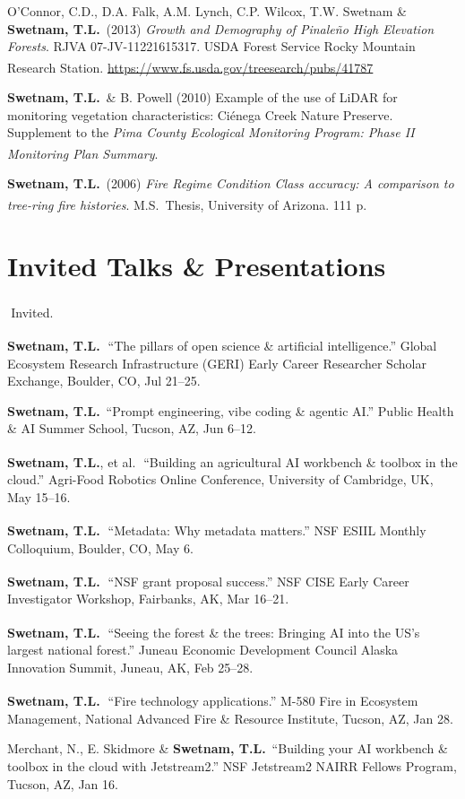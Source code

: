\documentclass[11pt,letterpaper]{article}
\newcommand{\me}{\textbf{Swetnam, T.L.}}
\newcommand{\inv}{\textsuperscript{\color{cherry}\,\ding{72}}}
\newcommand{\grad}{\textsuperscript{\color{muted}\,\dag}}
\newcommand{\yearhead}[1]{\par\vspace{5pt}{\small\bfseries\color{cherry}#1}\par\vspace{2pt}}
\newcommand{\note}[1]{{\small\color{muted}#1}}
\newenvironment{hanglist}
  {\begin{list}{}{\setlength{\leftmargin}{1.4em}\setlength{\itemindent}{-1.4em}%
     \setlength{\itemsep}{3pt}\setlength{\parsep}{0pt}\setlength{\topsep}{1pt}}}
  {\end{list}}
\begin{document}
\begin{hanglist}
\item O'Connor, C.D., D.A. Falk, A.M. Lynch, C.P. Wilcox, T.W. Swetnam \& \me\ (2013) \textit{Growth and Demography of Pinale\~no High Elevation Forests}. RJVA 07-JV-11221615317. USDA Forest Service Rocky Mountain Research Station. \url{https://www.fs.usda.gov/treesearch/pubs/41787}\grad
\item \me\ \& B. Powell (2010) Example of the use of LiDAR for monitoring vegetation characteristics: Ci\'enega Creek Nature Preserve. Supplement to the \textit{Pima County Ecological Monitoring Program: Phase II Monitoring Plan Summary}.\grad
\item \me\ (2006) \textit{Fire Regime Condition Class accuracy: A comparison to tree-ring fire histories}. M.S.\ Thesis, University of Arizona. 111 p.\grad
\end{hanglist}

\section{Invited Talks \& Presentations}
\note{\inv\,Invited.}

\yearhead{2025}
\begin{hanglist}
\item \me\inv\ ``The pillars of open science \& artificial intelligence.'' Global Ecosystem Research Infrastructure (GERI) Early Career Researcher Scholar Exchange, Boulder, CO, Jul 21--25.
\item \me\ ``Prompt engineering, vibe coding \& agentic AI.'' Public Health \& AI Summer School, Tucson, AZ, Jun 6--12.
\item \me, et al.\inv\ ``Building an agricultural AI workbench \& toolbox in the cloud.'' Agri-Food Robotics Online Conference, University of Cambridge, UK, May 15--16.
\item \me\inv\ ``Metadata: Why metadata matters.'' NSF ESIIL Monthly Colloquium, Boulder, CO, May 6.
\item \me\inv\ ``NSF grant proposal success.'' NSF CISE Early Career Investigator Workshop, Fairbanks, AK, Mar 16--21.
\item \me\inv\ ``Seeing the forest \& the trees: Bringing AI into the US's largest national forest.'' Juneau Economic Development Council Alaska Innovation Summit, Juneau, AK, Feb 25--28.
\item \me\inv\ ``Fire technology applications.'' M-580 Fire in Ecosystem Management, National Advanced Fire \& Resource Institute, Tucson, AZ, Jan 28.
\item Merchant, N., E. Skidmore \& \me\ ``Building your AI workbench \& toolbox in the cloud with Jetstream2.'' NSF Jetstream2 NAIRR Fellows Program, Tucson, AZ, Jan 16.
\end{hanglist}
\end{document}
